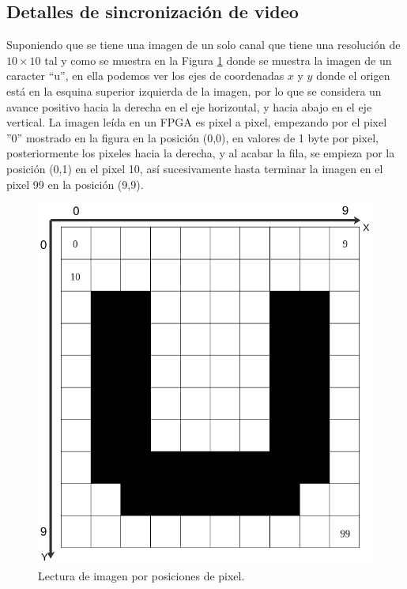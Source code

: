 \documentclass[twoside,spanish,ESP,MSc]{plantillaLabUPV}
\theoremstyle{definition}
\begin{document}
\subsection*{Detalles de sincronización de video}
Suponiendo que se tiene una imagen de un solo canal que tiene una resolución de $10\times10$ tal y como se muestra en la Figura \ref{u} donde se muestra la imagen de un caracter ``u'', en ella podemos ver los ejes de coordenadas $x$ y $y$ donde el origen está en la esquina superior izquierda de la imagen, por lo que se considera un avance positivo hacia la derecha en el eje horizontal, y hacia abajo en el eje vertical. La imagen leída en un FPGA es pixel a pixel, empezando por el pixel ''0'' mostrado en la figura en la posición (0,0), en valores de 1 byte por pixel, posteriormente los pixeles hacia la derecha, y al acabar la fila, se empieza por la posición (0,1) en el pixel 10, así sucesivamente hasta terminar la imagen en el pixel 99 en la posición (9,9).

\begin{figure}[!tbh]
	\centering
	\includegraphics[scale=0.3]{edrawimas/leeimag}
	\caption{Lectura de imagen por posiciones de pixel. 
	\label{u}}
\end{figure}
\end{document}
